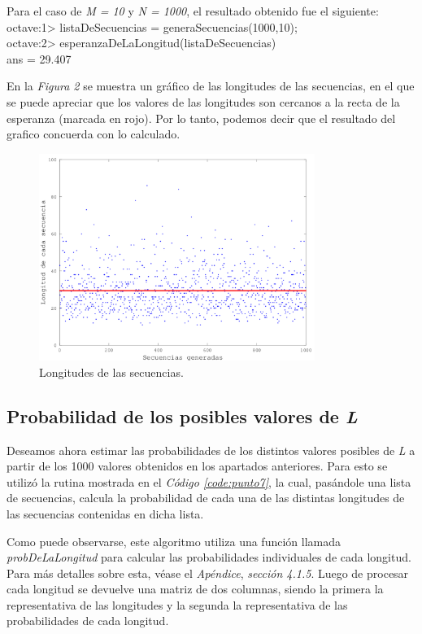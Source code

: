 \documentclass{article}
\newcommand{\refcode}[1]{\textit{Código \ref{#1}}}
\begin{document}

\bigskip

\bigskip 
\noindent Para el caso de \textit{M = 10} y \textit{N = 1000}, el resultado obtenido fue el siguiente:\\

{\ttfamily\footnotesize
\indent octave:1> listaDeSecuencias = generaSecuencias(1000,10);\\
\indent octave:2> esperanzaDeLaLongitud(listaDeSecuencias)\\
\indent ans =  29.407}

\bigskip
En la \textit{Figura 2} se muestra un gráfico de las longitudes de las secuencias, en el que se puede apreciar que los valores de las longitudes son cercanos a la recta de la esperanza (marcada en rojo). Por lo tanto, podemos decir que el resultado del grafico concuerda con lo calculado. \\

\begin{figure}[h]
	\centering
	\includegraphics[width=0.80\textwidth]{images/longitudes.png}
	\caption{Longitudes de las secuencias.}
\end{figure}
\bigskip



\subsection{Probabilidad de los posibles valores de \textit{L}}

Deseamos ahora estimar las probabilidades de los distintos valores posibles de \textit{L} a partir de los 1000 valores obtenidos en los apartados anteriores. Para esto se utilizó la rutina mostrada en el \refcode{code:punto7}, la cual, pasándole una lista de secuencias, calcula la probabilidad de cada una de las distintas longitudes de las secuencias contenidas en dicha lista.
	\par
	Como puede observarse, este algoritmo utiliza una función llamada \textit{probDeLaLongitud} para calcular las probabilidades individuales de cada longitud. Para más detalles sobre esta, véase el \textit{Apéndice}, \textit{sección 4.1.5}. Luego de procesar cada longitud se devuelve una matriz de dos columnas, siendo la primera la representativa de las longitudes y la segunda la representativa de las probabilidades de cada longitud.
\end{document}
